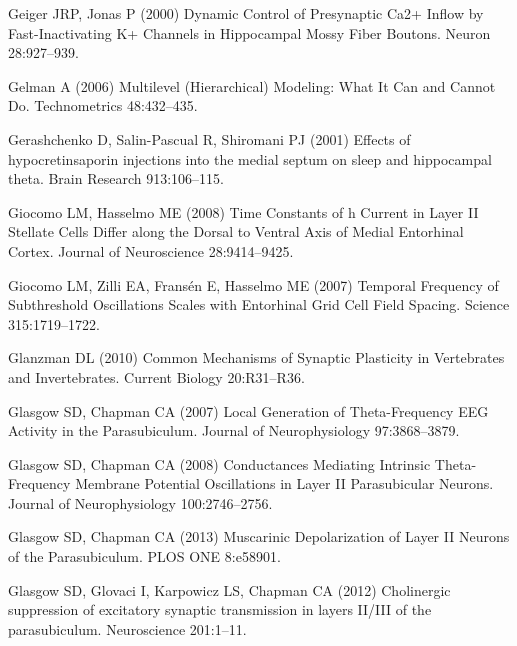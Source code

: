 \documentclass[
  12pt,
  a4paper,
  openany]{book}
\newlength{\cslhangindent}
\newlength{\cslentryspacingunit} %
\newenvironment{CSLReferences}[2] %
 {%
  \setlength{\parindent}{0pt}
  \ifodd #1
  \let\oldpar\par
  \def\par{\hangindent=\cslhangindent\oldpar}
  \fi
  \setlength{\parskip}{#2\cslentryspacingunit}
 }%
 {}
\begin{document}
\begin{CSLReferences}{1}{0}
\leavevmode{}%
Geiger JRP, Jonas P (2000) Dynamic {Control} of {Presynaptic} {Ca2}+ {Inflow} by {Fast}-{Inactivating} {K}+ {Channels} in {Hippocampal} {Mossy} {Fiber} {Boutons}. Neuron 28:927--939.

\leavevmode{}%
Gelman A (2006) Multilevel ({Hierarchical}) {Modeling}: {What} {It} {Can} and {Cannot} {Do}. Technometrics 48:432--435.

\leavevmode{}%
Gerashchenko D, Salin-Pascual R, Shiromani PJ (2001) Effects of hypocretin{\textendash}saporin injections into the medial septum on sleep and hippocampal theta. Brain Research 913:106--115.

\leavevmode{}%
Giocomo LM, Hasselmo ME (2008) Time {Constants} of h {Current} in {Layer} {II} {Stellate} {Cells} {Differ} along the {Dorsal} to {Ventral} {Axis} of {Medial} {Entorhinal} {Cortex}. Journal of Neuroscience 28:9414--9425.

\leavevmode{}%
Giocomo LM, Zilli EA, Fransén E, Hasselmo ME (2007) Temporal {Frequency} of {Subthreshold} {Oscillations} {Scales} with {Entorhinal} {Grid} {Cell} {Field} {Spacing}. Science 315:1719--1722.

\leavevmode{}%
Glanzman DL (2010) Common {Mechanisms} of {Synaptic} {Plasticity} in {Vertebrates} and {Invertebrates}. Current Biology 20:R31--R36.

\leavevmode{}%
Glasgow SD, Chapman CA (2007) Local {Generation} of {Theta}-{Frequency} {EEG} {Activity} in the {Parasubiculum}. Journal of Neurophysiology 97:3868--3879.

\leavevmode{}%
Glasgow SD, Chapman CA (2008) Conductances {Mediating} {Intrinsic} {Theta}-{Frequency} {Membrane} {Potential} {Oscillations} in {Layer} {II} {Parasubicular} {Neurons}. Journal of Neurophysiology 100:2746--2756.

\leavevmode{}%
Glasgow SD, Chapman CA (2013) Muscarinic {Depolarization} of {Layer} {II} {Neurons} of the {Parasubiculum}. PLOS ONE 8:e58901.

\leavevmode{}%
Glasgow SD, Glovaci I, Karpowicz LS, Chapman CA (2012) Cholinergic suppression of excitatory synaptic transmission in layers {II}/{III} of the parasubiculum. Neuroscience 201:1--11.


\end{CSLReferences}
\end{document}
